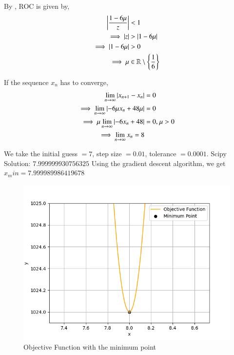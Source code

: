 \documentclass[journal]{IEEEtran}
\begin{document}
By \brak{\ref{ztrans_eq}}, ROC is given by,
\begin{align}
    \left\vert\frac{1 - 6\mu}{z}\right\vert &< 1\\
    \implies \left\vert z\right\vert &> \left\vert1 - 6\mu\right\vert\\
    \implies \left\vert1 - 6\mu\right\vert &> 0\\
    \implies \mu &\in \mathbb{R} \setminus \left\{\frac{1}{6}\right\}
\end{align}

If the sequence $x_n$ has to converge,
\begin{align}
    \lim_{n\to\infty} \left\vert x_{n + 1} - x_n\right\vert &= 0\\
    \implies \lim_{n\to\infty} \left\vert-6\mu x_n + 48\mu\right\vert &= 0\\
    \implies \mu \lim_{n\to\infty} \left\vert-6x_n + 48\right\vert &= 0 \text{, } \mu > 0\\
    \implies \lim_{n\to\infty} x_n = 8
\end{align}

We take the initial guess $= 7$, step size $= 0.01$, tolerance $= 0.0001$.
\newline
Scipy Solution: $7.999999930756325$
\newline
Using the gradient descent algorithm, we get $x_min = 7.999989986419678$

\begin{figure}[h!]
   \centering
   \includegraphics[width=0.7\columnwidth]{figs/graph.png}
   \caption{Objective Function with the minimum point}
   \label{label}
\end{figure}
\end{document}
